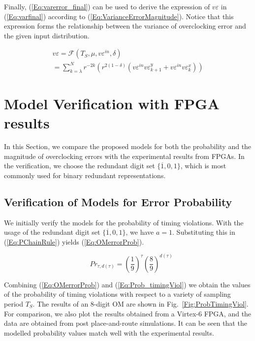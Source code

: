 \documentclass[journal]{IEEEtran}
\begin{document}
Finally, (\ref{Eq:varerror_final}) can be used to derive the expression of $v\varepsilon$ in (\ref{Eq:varfinal}) according to (\ref{Eq:VarianceErrorMagnitude}). Notice that this expression forms the relationship between the variance of overclocking error and the given input distribution.

\begin{equation}\label{Eq:varfinal}
\begin{array}{l}
v\varepsilon =  \mathcal{F}(T_S, \mu, v\varepsilon^{in}, \delta)\\
=\sum_{k=\lambda}^{N}r^{-2k} \left( r^{2(1-\delta)} \left(v\varepsilon^{in}    v\varepsilon^y_{k+1} +v\varepsilon^{in}   v\varepsilon^x_k\right)\right)
\end{array}
\end{equation}




\section{Model Verification with FPGA results}

In this Section, we compare the proposed models for both the probability and the magnitude of overclocking errors with the experimental results from FPGAs. In the verification, we choose the redundant digit set $\{\overline{1},0,1\}$, which is most commonly used for binary redundant representations. 

\subsection{Verification of Models for Error Probability}
We initially verify the models for the probability of timing violations. With the usage of the redundant digit set $\{\overline{1},0,1\}$, we have $a=1$. Substituting this in (\ref{Eq:PChainRule}) yields (\ref{Eq:OMerrorProb}).

\begin{equation}\label{Eq:OMerrorProb}
 \quad Pr_{\tau,d(\tau )} =\left(\frac{1}{9}\right)^\tau \left(\frac{8}{9}\right)^{d(\tau )} 
\end{equation}

Combining (\ref{Eq:OMerrorProb}) and (\ref{Eq:Prob_timingViol}) we obtain the values of the probability of timing violations with respect to a variety of sampling period $T_S$. The results of an 8-digit OM are shown in Fig.~\ref{Fig:ProbTimingViol}. For comparison, we also plot the results obtained from a Virtex-6 FPGA, and the data are obtained from post place-and-route simulations. It can be seen that the modelled probability values match well with the experimental results.
\end{document}
